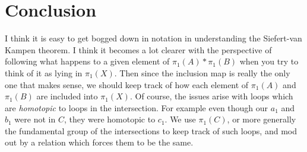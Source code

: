 \documentclass[11pt]{amsart}
\begin{document}
\section{Conclusion}

I think it is easy to get bogged down in notation in understanding the Siefert-van Kampen theorem. I think it becomes a lot clearer with the perspective of following what happens to a given element of $\pi_1(A)*\pi_1(B)$ when you try to think of it as lying in $\pi_1(X)$. Then since the inclusion map is really the only one that makes sense, we should keep track of how each element of $\pi_1(A)$ and $\pi_1(B)$ are included into $\pi_1(X)$. Of course, the issues arise with loops which are \textit{homotopic} to loops in the intersection. For example even though our $a_1$ and $b_1$ were not in $C$, they were homotopic to $c_1$. We use $\pi_1(C)$, or more generally the fundamental group of the intersections to keep track of such loops, and mod out by a relation which forces them to be the same.
\end{document}
